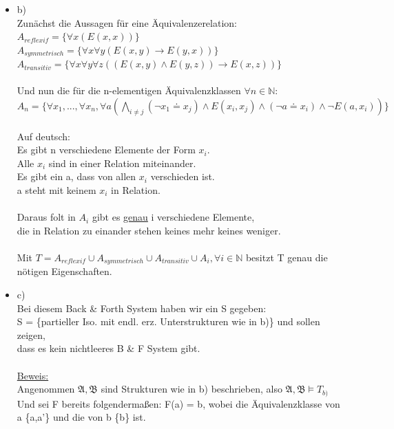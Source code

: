 \documentclass[a4paper]{scrartcl}
\begin{document}
\begin{itemize}
        \item b)\\
            Zunächst die Aussagen für eine Äquivalenzerelation:\\
            $A_{reflexif} = \{\forall x (E(x,x))\}$\\
            $A_{symmetrisch} = \{\forall x \forall y (E(x,y) \rightarrow E(y,x))\}$\\
            $A_{transitiv} = \{\forall x \forall y \forall z ((E(x,y) \land E(y,z)) \rightarrow E(x,z))\}$\\
            \\Und nun die für die n-elementigen Äquivalenzklassen $\forall n \in \mathds{N}$:\\
            $A_n = \{\forall x_1,...,\forall x_n,\forall a (\bigwedge_{i \neq j} (\neg x_1 \doteq x_j)  \land E(x_i,x_j) \land (\neg a \doteq x_i) \land \neg E(a, x_i))\}$\\
            \\Auf deutsch:\\
            Es gibt n verschiedene Elemente der Form $x_i$.\\
            Alle $x_i$ sind in einer Relation miteinander.\\
            Es gibt ein a, dass von allen $x_i$ verschieden ist.\\
            a steht mit keinem $x_i$ in Relation.\\
            \\Daraus folt in $A_i$ gibt es \underline{genau} i verschiedene Elemente,
            \\die in Relation zu einander stehen keines mehr keines weniger.\\

            \\Mit $T = A_{reflexif} \cup A_{symmetrisch} \cup A_{transitiv} \cup A_i, \forall i \in \mathds{N}$ besitzt T genau die nötigen Eigenschaften.\\

        \item c)\\
            Bei diesem Back \& Forth System haben wir ein S gegeben:\\
            S = \{partieller Iso. mit endl. erz. Unterstrukturen wie in b)\} und sollen zeigen,\\
            dass es kein nichtleeres B \& F System gibt.\\

           \\\underline{Beweis:}\\
            Angenommen $\mathfrak{A}, \mathfrak{B}$ sind Strukturen wie in b) beschrieben, also $\mathfrak{A}, \mathfrak{B} \models T_{b)}$\\
            Und sei F bereits folgendermaßen: F(a) = b, wobei die Äquivalenzklasse von a \{a,a'\} und die von b \{b\} ist.\\


\end{itemize}
\end{document}
